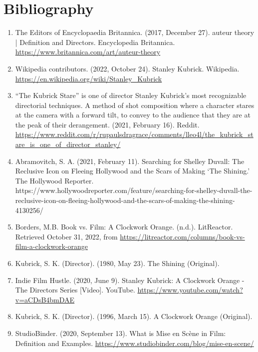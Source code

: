 \documentclass[12pt]{article}
\begin{document}
\section*{Bibliography}
\begin{enumerate}
        \item The Editors of Encyclopaedia Britannica. (2017, December 27). auteur theory | Definition and Directors. Encyclopedia Britannica. \url{https://www.britannica.com/art/auteur-theory}
        \item Wikipedia contributors. (2022, October 24). Stanley Kubrick. Wikipedia. \url{https://en.wikipedia.org/wiki/Stanley_Kubrick}
        \item “The Kubrick Stare” is one of director Stanley Kubrick's most recognizable directorial techniques. A method of shot composition where a character stares at the camera with a forward tilt, to convey to the audience that they are at the peak of their derangement. (2021, February 16). Reddit. \url{https://www.reddit.com/r/rupaulsdragrace/comments/lleo4l/the_kubrick_stare_is_one_of_director_stanley/}
        \item Abramovitch, S. A. (2021, February 11). Searching for Shelley Duvall: The Reclusive Icon on Fleeing Hollywood and the Scars of Making ‘The Shining.’ The Hollywood Reporter. https://www.hollywoodreporter.com/feature/searching-for-shelley-duvall-the-reclusive-icon-on-fleeing-hollywood-and-the-scars-of-making-the-shining-4130256/
        \item Borders, M.B. Book vs. Film: A Clockwork Orange. (n.d.). LitReactor. Retrieved October 31, 2022, from \url{https://litreactor.com/columns/book-vs-film-a-clockwork-orange}
        \item Kubrick, S. K. (Director). (1980, May 23). The Shining (Original).
        \item Indie Film Hustle. (2020, June 9). Stanley Kubrick: A Clockwork Orange - The Directors Series [Video]. YouTube. \url{https://www.youtube.com/watch?v=aCDsB4bmDAE}
        \item Kubrick, S. K. (Director). (1996, March 15). A Clockwork Orange (Original).
        \item StudioBinder. (2020, September 13). What is Mise en Scène in Film: Definition and Examples. \url{https://www.studiobinder.com/blog/mise-en-scene/}
\end{enumerate}
\end{document}
